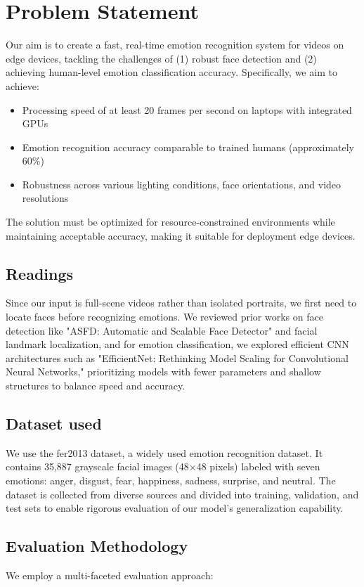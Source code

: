 \section{Problem Statement}
Our aim is to create a fast, real-time emotion recognition system for videos on edge devices, tackling the challenges of (1) robust face detection and (2) achieving human-level emotion classification accuracy. Specifically, we aim to achieve:

\begin{itemize}
    \item Processing speed of at least 20 frames per second on laptops with integrated GPUs
    \item Emotion recognition accuracy comparable to trained humans (approximately 60\%)
    \item Robustness across various lighting conditions, face orientations, and video resolutions
\end{itemize}

The solution must be optimized for resource-constrained environments while maintaining acceptable accuracy, making it suitable for deployment edge devices.

\subsection{Readings}
Since our input is full-scene videos rather than isolated portraits, we first need to locate faces before recognizing emotions. We reviewed prior works on face detection like "ASFD: Automatic and Scalable Face Detector"\cite{ASFD} and facial landmark localization, and for emotion classification, we explored efficient CNN architectures such as "EfficientNet: Rethinking Model Scaling for Convolutional Neural Networks,"\cite{EfficientNet} prioritizing models with fewer parameters and shallow structures to balance speed and accuracy.
\subsection{Dataset used}
We use the fer2013 dataset, a widely used emotion recognition dataset. It contains 35,887 grayscale facial images (48×48 pixels) labeled with seven emotions: anger, disgust, fear, happiness, sadness, surprise, and neutral. The dataset is collected from diverse sources and divided into training, validation, and test sets to enable rigorous evaluation of our model's generalization capability.

\subsection{Evaluation Methodology}
We employ a multi-faceted evaluation approach:

